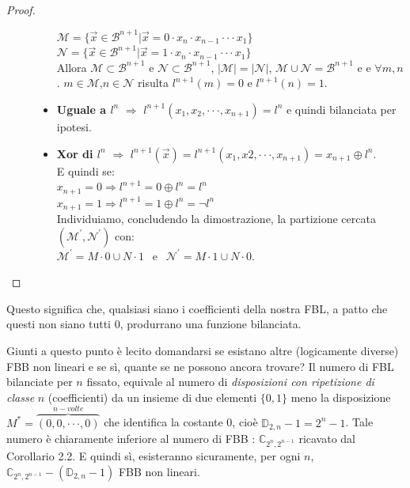 \documentclass[12pt,a4paper,openright]{report}
\newcommand*\xor{\mathbin{\oplus}}
\begin{document}
\begin{proof}
\begin{description}
\begin{itemize}
                                                              $\mathcal{M}= \{\vec x \in \mathcal{B}^{n+1} | \vec x = 0\cdot x_n \cdot x_{n-1}\cdot\cdot\cdot x_1\}$\\
                                                              $\mathcal{N}= \{\vec x \in \mathcal{B}^{n+1} | \vec x = 1\cdot x_n \cdot x_{n-1}\cdot\cdot\cdot x_1\}$\\
                                                              Allora $\mathcal{M}\subset\mathcal{B}^{n+1}$ e $\mathcal{N}\subset\mathcal{B}^{n+1}$, ${\left\vert{\mathcal{M}}\right\vert} = {\left\vert{\mathcal{N}}\right\vert}$, $\mathcal{M} \cup \mathcal{N} = \mathcal{B}^{n+1}$ e
                                                              e $\forall m,n$. $m\in\mathcal{M}$,$n \in\mathcal{N}$ risulta $l^{n+1}(m) = 0$ e $ l^{n+1}(n) = 1$.
                                    \item \textbf{Uguale a $l^n$} $\Rightarrow$  $l^{n+1}(x_1,x_2,\cdot\cdot\cdot,x_{n+1}) = l^n$ e quindi bilanciata per ipotesi. 
                                    \item \textbf{Xor di $l^n$} $\Rightarrow$ $l^{n+1}(\vec{x}) = l^{n+1}(x_1,x2,\cdot\cdot\cdot,x_{n+1})= x_{n+1} \xor l^n$.
                                    \\ E quindi se:\\
                                    $x_{n+1} = 0 \Rightarrow l^{n+1} = 0 \xor l^n = l^n$ \\
                                    $x_{n+1} = 1 \Rightarrow l^{n+1} = 1 \xor l^n = \neg l^n$\\
                                    Individuiamo, concludendo la dimostrazione, la partizione cercata $(\mathcal{M^\prime},\mathcal{N^\prime})$ con:\\
                                    $\mathcal{M^\prime} = M\cdot0 \cup N\cdot1 \:\:$  e  $\:\: \mathcal{N^\prime} = M\cdot1 \cup N\cdot0$.
                                \end{itemize}
    \end{description}
\end{proof}
\noindent Questo significa che, qualsiasi siano i coefficienti della nostra FBL, a patto che questi non siano tutti $0$, produrrano una funzione bilanciata.\par

Giunti a questo punto è lecito domandarsi se esistano altre (logicamente diverse) FBB  non lineari e se sì, quante se ne possono ancora trovare?
Il numero di FBL bilanciate per $n$ fissato, equivale al numero di \textit{disposizioni con ripetizione di classe} $n$ (coefficienti) da un insieme di due elementi $\{0,1\}$ meno la disposizione $M^*=\overbrace{(0,0,\cdot\cdot\cdot,0)}^{n-volte}$ che identifica la costante 0, cioè $\mathbb{D}_{2,n}-1= 2^n - 1$.
Tale numero è chiaramente inferiore al numero di FBB : $\mathbb{C}_{2^n,2^{n-1}}$ ricavato dal Corollario 2.2. E quindi sì, esisteranno sicuramente, per ogni $n$, $\mathbb{C}_{2^n,2^{n-1}} - (\mathbb{D}_{2,n} - 1)$ FBB non lineari.
\end{document}
